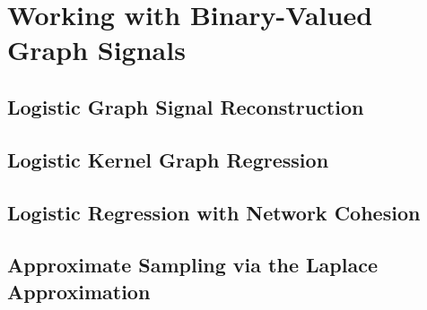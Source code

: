 \chapter{Working with Binary-Valued Graph Signals} %

\label{chap:binary} %



\section{Logistic Graph Signal Reconstruction}

\label{sec:lgsr}


\cite{Li2012}

\section{Logistic Kernel Graph Regression}


\label{sec:lkgr}


\section{Logistic Regression with Network Cohesion}

\label{sec:lrnc}


\section{Approximate Sampling via the Laplace Approximation}

\label{sec:lsamp}

